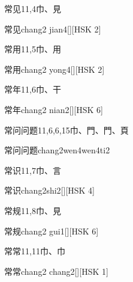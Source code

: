\begin{entry}{常见}{11,4}{⼱、⾒}
  \begin{phonetics}{常见}{chang2 jian4}[][HSK 2]
  \end{phonetics}
\end{entry}

\begin{entry}{常用}{11,5}{⼱、⽤}
  \begin{phonetics}{常用}{chang2 yong4}[][HSK 2]
  \end{phonetics}
\end{entry}

\begin{entry}{常年}{11,6}{⼱、⼲}
  \begin{phonetics}{常年}{chang2 nian2}[][HSK 6]
  \end{phonetics}
\end{entry}

\begin{entry}{常问问题}{11,6,6,15}{⼱、⾨、⾨、⾴}
  \begin{phonetics}{常问问题}{chang2wen4wen4ti2}
  \end{phonetics}
\end{entry}

\begin{entry}{常识}{11,7}{⼱、⾔}
  \begin{phonetics}{常识}{chang2shi2}[][HSK 4]
  \end{phonetics}
\end{entry}

\begin{entry}{常规}{11,8}{⼱、⾒}
  \begin{phonetics}{常规}{chang2 gui1}[][HSK 6]
  \end{phonetics}
\end{entry}

\begin{entry}{常常}{11,11}{⼱、⼱}
  \begin{phonetics}{常常}{chang2 chang2}[][HSK 1]
  \end{phonetics}
\end{entry}

